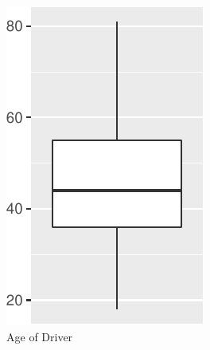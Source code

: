 \begin{figure}[H]

\begin{subfigure}{.24\textwidth}
  \centering
  \includegraphics[width=\linewidth]{exploration_files/figure-latex/dist_boxplots-1.pdf}
  \caption{Age of Driver}
\end{subfigure}
\begin{subfigure}{.24\textwidth}
  \centering

\end{subfigure}
\end{figure}
